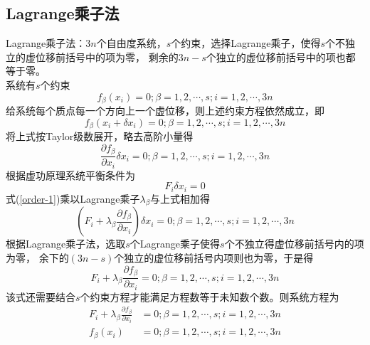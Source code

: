 \documentclass[12pt]{article}
\numberwithin{equation}{section}
\begin{document}
        \subsection{Lagrange乘子法}

	    Lagrange乘子法：$3n$个自由度系统，$s$个约束，选择Lagrange乘子，使得$s$个不独立的虚位移前括号中的项为零，
        剩余的$3n-s$个独立的虚位移前括号中的项也都等于零。\\
        系统有$s$个约束
        \begin{equation}
            f_{\beta}(x_i)=0;\beta=1,2,\cdots,s;i=1,2,\cdots,3n
        \end{equation}
        给系统每个质点每一个方向上一个虚位移，则上述约束方程依然成立，即
        \begin{equation}
            f_{\beta}(x_i+\delta x_i)=0;\beta=1,2,\cdots,s;i=1,2,\cdots,3n
        \end{equation}
        将上式按Taylor级数展开，略去高阶小量得
        \begin{equation}\label{order-1}
            \frac{\partial f_{\beta}}{\partial x_i}\delta x_i=0;\beta=1,2,\cdots,s;i=1,2,\cdots,3n
        \end{equation}
        根据虚功原理系统平衡条件为
        \begin{equation}
            F_i\delta x_i=0
        \end{equation}
        式(\ref{order-1})乘以Lagrange乘子$\lambda_{\beta}$与上式相加得
        \begin{equation}
            \left(F_i+\lambda_{\beta}\frac{\partial f_{\beta}}{\partial x_i}\right)\delta x_i=0;\beta=1,2,\cdots,s;i=1,2,\cdots,3n
        \end{equation}
        根据Lagrange乘子法，选取$s$个Lagrange乘子使得$s$个不独立得虚位移前括号内的项为零，
        余下的$(3n-s)$个独立的虚位移前括号内项则也为零，于是得
        \begin{equation}
            F_i+\lambda_{\beta}\frac{\partial f_{\beta}}{\partial x_i}=0;\beta=1,2,\cdots,s;i=1,2,\cdots,3n
        \end{equation}
        该式还需要结合$s$个约束方程才能满足方程数等于未知数个数。则系统方程为
        \begin{equation}
            \begin{aligned}
                F_i+\lambda_{\beta}\frac{\partial f_{\beta}}{\partial x_i}&=0;\beta=1,2,\cdots,s;i=1,2,\cdots,3n\\
                f_{\beta}(x_i)&=0;\beta=1,2,\cdots,s;i=1,2,\cdots,3n
            \end{aligned}
        \end{equation}
\end{document}
